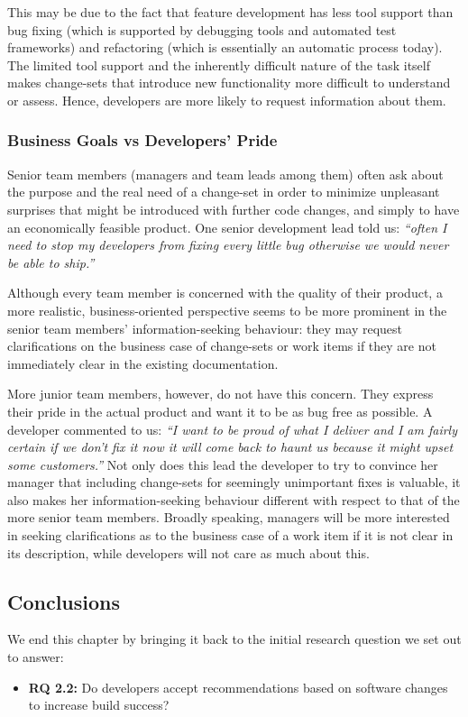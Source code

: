 This may be due to the fact that feature development has less tool support than bug fixing (which is supported by debugging tools and automated test frameworks) and refactoring (which is essentially an automatic process today). The limited tool support and the inherently difficult nature of the task itself makes change-sets that introduce new functionality more difficult to understand or assess. Hence, developers are more likely to request information about them.


\subsubsection{Business Goals vs Developers' Pride}
Senior team members (managers and team leads among them) often ask about the purpose and the real need of a change-set in order to minimize unpleasant surprises that might be introduced with further code changes, and simply to have an economically feasible product. One senior development lead told us: \emph{``often I need to stop my developers from fixing every little bug otherwise we would never be able to ship.''}

Although every team member is concerned with the quality of their product, a more realistic, business-oriented perspective seems to be more prominent in the senior team members' information-seeking behaviour: they may request clarifications on the business case of change-sets or work items if they are not immediately clear in the existing documentation.

More junior team members, however, do not have this concern. They express their pride in the actual product and want it to be as bug free as possible. A developer commented to us: \emph{``I want to be proud of what I deliver and I am fairly certain if we don't fix it now it will come back to haunt us because it might upset some customers.''} Not only does this lead the developer to try to convince her manager that including change-sets for seemingly unimportant fixes is valuable, it also makes her information-seeking behaviour different with respect to that of the more senior team members. Broadly speaking, managers will be more interested in seeking clarifications as to the business case of a work item if it is not clear in its description, while developers will not care as much about this.


\subsection{Conclusions}
\label{sec:conclusions}
We end this chapter by bringing it back to the initial research question we set out to answer:
\begin{itemize}
  \item\textbf{RQ 2.2:} Do developers accept recommendations based on software changes to increase build success? 
\end{itemize}

